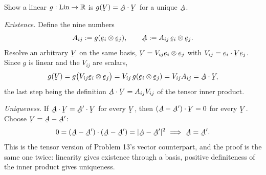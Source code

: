 \begin{problem}
Show a linear $g:\operatorname{Lin}\to\mathbb{R}$ is $g(\bV)=\bA\cdot\bV$ for a unique $\bA$.
\end{problem}
\begin{solution}
\emph{Existence.} Define the nine numbers
\[
   A_{ij}:=g(\be_i\otimes\be_j),\qquad
   \bA:=A_{ij}\,\be_i\otimes\be_j .
\]
Resolve an arbitrary $\bV$ on the same basis,
$\bV=V_{ij}\be_i\otimes\be_j$ with $V_{ij}=\ip{\be_i}{\bV\be_j}$. Since
$g$ is linear and the $V_{ij}$ are scalars,
\[
   g(\bV)=g\big(V_{ij}\be_i\otimes\be_j\big)
        =V_{ij}\,g(\be_i\otimes\be_j)
        =V_{ij}A_{ij}=\bA\cdot\bV ,
\]
the last step being the definition $\bA\cdot\bV=A_{ij}V_{ij}$ of the
tensor inner product.

\emph{Uniqueness.} If $\bA\cdot\bV=\bA'\cdot\bV$ for every $\bV$, then
$(\bA-\bA')\cdot\bV=0$ for every $\bV$. Choose $\bV=\bA-\bA'$:
\[
   0=(\bA-\bA')\cdot(\bA-\bA')=|\bA-\bA'|^{2}
   \ \Longrightarrow\ \bA=\bA' .
\]
This is the tensor version of Problem 13's vector counterpart, and the
proof is the same one twice: linearity gives existence through a basis,
positive definiteness of the inner product gives uniqueness.
\end{solution}

